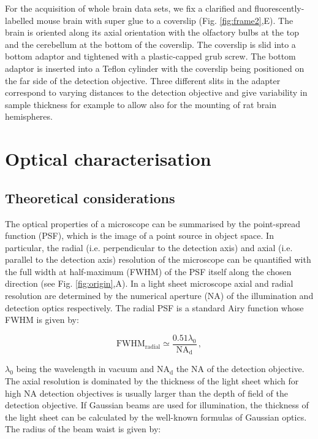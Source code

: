 \documentclass[12pt]{spieman}  %
\begin{document}
For the acquisition of whole brain data sets, we fix a clarified and fluorescently-labelled mouse brain with super glue to a coverslip (Fig. \ref{fig:frame2},E). The brain is oriented along its axial orientation with the olfactory bulbs at the top and the cerebellum at the bottom of the coverslip. The coverslip is slid into a bottom adaptor and tightened with a plastic-capped grub screw. The bottom adaptor is inserted into a Teflon cylinder with the coverslip being positioned on the far side of the detection objective. Three different slits in the adapter correspond to varying distances to the detection objective and give variability in sample thickness for example to allow also for the mounting of rat brain hemispheres.
	
\section{Optical characterisation}

\subsection{Theoretical considerations}


The optical properties of a microscope can be summarised by the point-spread function (PSF), which is the image of a point source in object space. In particular, the radial (i.e. perpendicular to the detection axis) and axial (i.e. parallel to the detection axis) resolution of the microscope can be quantified with the full width at half-maximum (FWHM) of the PSF itself along the chosen direction (see Fig. \ref{fig:origin},A). In a light sheet microscope axial and radial resolution are determined by the numerical aperture (NA) of the illumination and detection optics respectively. The radial PSF is a standard Airy function whose FWHM is given by:

\begin{equation}
\text{FWHM}_{\text{radial}} \simeq \frac{0.51 \lambda_0}{\text{NA}_{\text{d}}} \, ,
\end{equation}

$\lambda_0$ being the wavelength in vacuum and $\text{NA}_{\text{d}}$ the NA of the detection objective. The axial resolution is dominated by the thickness of the light sheet which for high NA detection objectives is usually larger than the depth of field of the detection objective. If Gaussian beams are used for illumination, the thickness of the light sheet can be calculated by the well-known formulas of Gaussian optics\cite{Teich}. The radius of the beam waist is given by:
\end{document}
